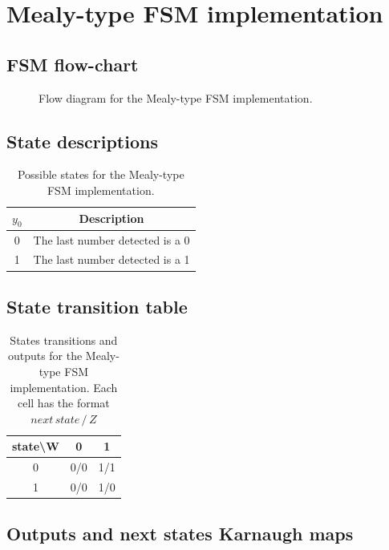 \documentclass[../../e3_tp3_main.tex]{subfiles}
\begin{document}
\section{Mealy-type FSM implementation}
\subsection{FSM flow-chart}
\begin{figure}[H]
	\centering
	
	\caption{Flow diagram for the Mealy-type FSM implementation.}
\end{figure}

\subsection{State descriptions}
\begin{table}[H]	%
	\centering
	\begin{tabular}{|c|c|}
	\hline	
	$y_0$  & Description\\	
	\hline 
	0 & The last number detected is a 0\\ 
	\hline 
	1 & The last number detected is a 1\\ 
	\hline 

	\end{tabular} 
	\caption{Possible states for the Mealy-type FSM implementation.}
	\label{tab:ej3_mealy_states}
\end{table}


\subsection{State transition table}
\begin{table}[H]
	\centering
	\begin{tabular}{|c|c|c|}
		\hline 
		state\textbackslash W & 0 & 1 \\ 
		\hline 
		0 & 0/0 & 1/1 \\ 
		\hline 
		1 & 0/0 & 1/0 \\ 
		\hline 
	\end{tabular} 
	\caption[States transitions and outputs for the Mealy-type FSM implementation]{States transitions and outputs for the Mealy-type FSM implementation. Each cell has the format $next\, state\, / \, Z$}
	\label{tab:ej3_mealy_transitions}
\end{table}

\subsection{Outputs and next states Karnaugh maps}
\end{document}
